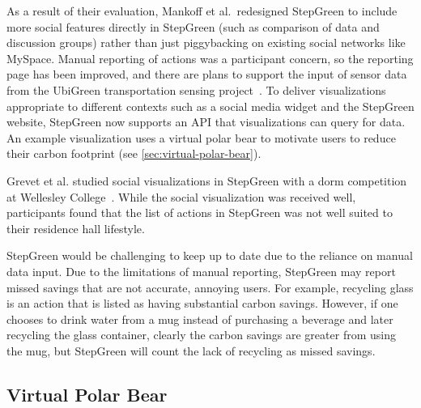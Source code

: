 As a result of their evaluation, Mankoff et al.\ redesigned StepGreen to include more social features directly in StepGreen (such as comparison of data and discussion groups) rather than just piggybacking on existing social networks like MySpace. Manual reporting of actions was a participant concern, so the reporting page has been improved, and there are plans to support the input of sensor data from the UbiGreen transportation sensing project~\cite{Froehlich2009-ubigreen}. To deliver visualizations appropriate to different contexts such as a social media widget and the StepGreen website, StepGreen now supports an API that visualizations can query for data. An example visualization uses a virtual polar bear to motivate users to reduce their carbon footprint (see \autoref{sec:virtual-polar-bear}).

Grevet et al. studied social visualizations in StepGreen with a dorm competition at Wellesley College~\cite{Grevet10}. While the social visualization was received well, participants found that the list of actions in StepGreen was not well suited to their residence hall lifestyle.

StepGreen would be challenging to keep up to date due to the reliance on manual data input. Due to the limitations of manual reporting, StepGreen may report missed savings that are not accurate, annoying users. For example, recycling glass is an action that is listed as having substantial carbon savings. However, if one chooses to drink water from a mug instead of purchasing a beverage and later recycling the glass container, clearly the carbon savings are greater from using the mug, but StepGreen will count the lack of recycling as missed savings.


\subsection{Virtual Polar Bear}
\label{sec:virtual-polar-bear}


